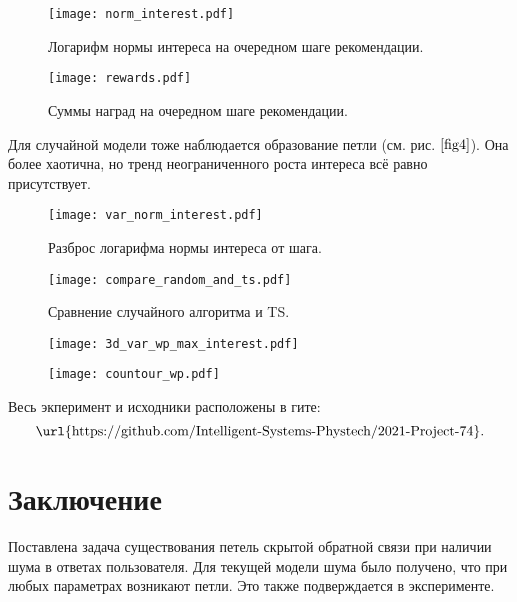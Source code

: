 \documentclass[12pt, twoside]{article}
\begin{document}
\begin{figure}[h]
  \begin{multicols}{2}
    \hfill
    \texttt{[image: norm\_interest.pdf]}
    \hfill
    \caption{Логарифм нормы интереса на очередном шаге рекомендации.}
    \label{fig1}
    \hfill
    \texttt{[image: rewards.pdf]}
    \hfill
    \caption{Суммы наград на очередном шаге рекомендации.}
    \label{fig2}
  \end{multicols}
\end{figure}


Для случайной модели тоже наблюдается образование петли (см. рис.$~\ref{fig4}$). 
Она более хаотична, но тренд неограниченного роста интереса всё равно присутствует.   

\newpage

\begin{figure}[h]
  \begin{multicols}{2}
    \hfill
    \texttt{[image: var\_norm\_interest.pdf]}
    \hfill
    \caption{Разброс логарифма нормы интереса от шага.}
    \label{fig3}
    \hfill
    \texttt{[image: compare\_random\_and\_ts.pdf]}
    \hfill
    \caption{Сравнение случайного алгоритма и TS.}
    \label{fig4}
  \end{multicols}
\end{figure}


\begin{figure}[h]
  \begin{multicols}{2}
    \hfill
    \texttt{[image: 3d\_var\_wp\_max\_interest.pdf]}
    \hfill
    \caption{}
    \label{fig5}
    \hfill
    \texttt{[image: countour\_wp.pdf]}
    \hfill
    \caption{}
    \label{fig6}
  \end{multicols}
\end{figure}

Весь экперимент и исходники расположены в гите: 
\[  \text{\url{https://github.com/Intelligent-Systems-Phystech/2021-Project-74}}. \]

\section{Заключение}
Поставлена задача существования петель скрытой обратной связи при наличии шума в ответах пользователя. 
Для текущей модели шума было получено, что при любых параметрах возникают петли. 
Это также подверждается в эксперименте.
\end{document}

